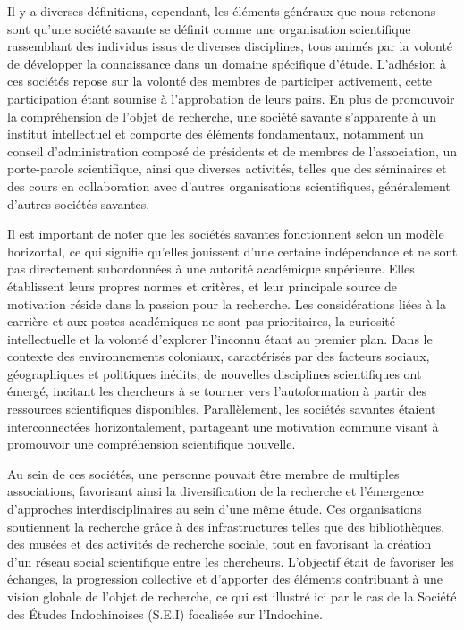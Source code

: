 Il y a diverses définitions, cependant, les éléments généraux que nous retenons sont qu'une société savante se définit comme une organisation scientifique rassemblant des individus issus de diverses disciplines, tous animés par la volonté de développer la connaissance dans un domaine spécifique d'étude. L'adhésion à ces sociétés repose sur la volonté des membres de participer activement, cette participation étant soumise à l'approbation de leurs pairs. En plus de promouvoir la compréhension de l'objet de recherche, une société savante s'apparente à un institut intellectuel et comporte des éléments fondamentaux, notamment un conseil d'administration composé de présidents et de membres de l'association, un porte-parole scientifique, ainsi que diverses activités, telles que des séminaires et des cours en collaboration avec d'autres organisations scientifiques, généralement d'autres sociétés savantes.

Il est important de noter que les sociétés savantes fonctionnent selon un modèle horizontal, ce qui signifie qu'elles jouissent d'une certaine indépendance et ne sont pas directement subordonnées à une autorité académique supérieure. Elles établissent leurs propres normes et critères, et leur principale source de motivation réside dans la passion pour la recherche. Les considérations liées à la carrière et aux postes académiques ne sont pas prioritaires, la curiosité intellectuelle et la volonté d'explorer l'inconnu étant au premier plan. Dans le contexte des environnements coloniaux, caractérisés par des facteurs sociaux, géographiques et politiques inédits, de nouvelles disciplines scientifiques ont émergé, incitant les chercheurs à se tourner vers l'autoformation à partir des ressources scientifiques disponibles. Parallèlement, les sociétés savantes étaient interconnectées horizontalement, partageant une motivation commune visant à promouvoir une compréhension scientifique nouvelle.

Au sein de ces sociétés, une personne pouvait être membre de multiples associations, favorisant ainsi la diversification de la recherche et l'émergence d'approches interdisciplinaires au sein d'une même étude. Ces organisations soutiennent la recherche grâce à des infrastructures telles que des bibliothèques, des musées et des activités de recherche sociale, tout en favorisant la création d'un réseau social scientifique entre les chercheurs. L'objectif était de favoriser les échanges, la progression collective et d'apporter des éléments contribuant à une vision globale de l'objet de recherche, ce qui est illustré ici par le cas de la Société des Études Indochinoises (S.E.I) focalisée sur l'Indochine.

